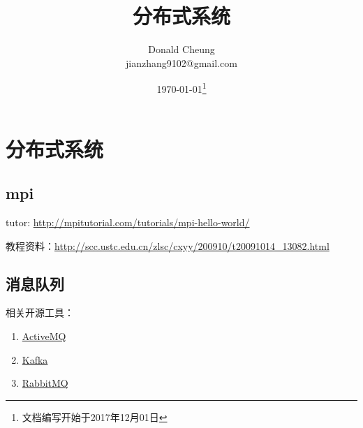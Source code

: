 \ifx\mlbook\undefined
    \providecommand{\pathroot}{../..}

    \title{分布式系统}
    \author{Donald Cheung\\jianzhang9102@gmail.com}
    \date{\today\footnote{文档编写开始于2017年12月01日}}

    
\fi

\chapter{分布式系统}

\section{mpi}

tutor: \url{http://mpitutorial.com/tutorials/mpi-hello-world/}

教程资料：\url{http://scc.ustc.edu.cn/zlsc/cxyy/200910/t20091014_13082.html}


\section{消息队列}
相关开源工具：
\begin{enumerate}
    \item \href{http://activemq.apache.org}{ActiveMQ}
    \item \href{https://kafka.apache.org}{Kafka}
    \item \href{http://www.rabbitmq.com}{RabbitMQ}
\end{enumerate}


\ifx\mlbook\undefined
    
\fi
